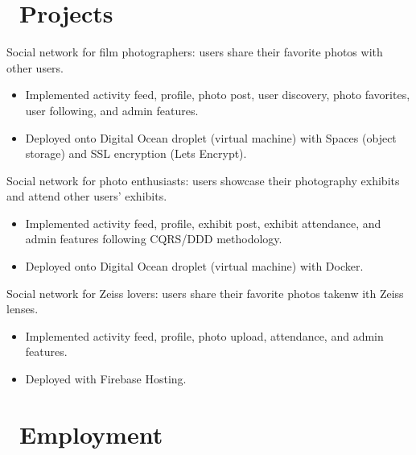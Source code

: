 \documentclass{resume}
\begin{document}



\section{\faCode\ Projects}
 {}
Social network for film photographers: users share their favorite photos with other users.
\begin{itemize}
  \item Implemented activity feed, profile, photo post, user discovery, photo
          favorites, user following, and
          admin features.
  \item Deployed onto Digital Ocean droplet (virtual machine) with Spaces
          (object storage) and SSL encryption (Lets Encrypt). 
\end{itemize}

Social network for photo enthusiasts: users showcase their photography exhibits
and attend other users' exhibits.
\begin{itemize}
  \item Implemented activity feed, profile, exhibit post, exhibit attendance, and admin
          features following CQRS/DDD methodology.
  \item Deployed onto Digital Ocean droplet (virtual machine) with Docker.
\end{itemize}

Social network for Zeiss lovers: users share their favorite photos takenw ith
Zeiss lenses.
\begin{itemize}
  \item Implemented activity feed, profile, photo upload, attendance, and admin
          features.
  \item Deployed with Firebase Hosting.
\end{itemize}


\section{\faUsers\ Employment}
\end{document}
